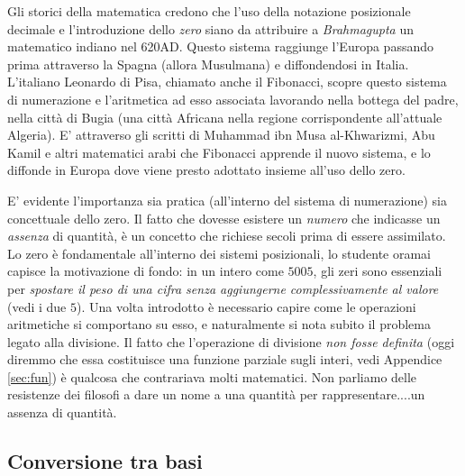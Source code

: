 {Gli storici della matematica credono che l'uso della notazione posizionale decimale e l'introduzione dello \emph{zero} siano da attribuire a \emph{Brahmagupta} un matematico indiano nel 620\textrm{AD}. Questo sistema raggiunge l'Europa passando prima attraverso la Spagna (allora Musulmana) e diffondendosi in Italia. L'italiano Leonardo di Pisa, chiamato anche il Fibonacci, scopre questo sistema di numerazione e l'aritmetica ad esso associata lavorando nella bottega del padre, nella città di Bugia (una città Africana nella regione corrispondente all'attuale Algeria).
E' attraverso gli scritti di Muhammad ibn Musa al-Khwarizmi, Abu Kamil e altri matematici arabi che Fibonacci apprende il nuovo sistema, e lo diffonde in Europa dove viene presto adottato insieme all'uso dello zero. 

E' evidente l'importanza sia pratica (all'interno
del sistema di numerazione) sia concettuale dello zero. Il fatto che dovesse
esistere un \emph{numero} che indicasse un \emph{assenza} di quantità, è un
concetto che richiese secoli prima di essere assimilato. Lo zero è fondamentale
all'interno dei sistemi posizionali, lo studente oramai capisce la motivazione
di fondo: in un intero come $5005$, gli zeri sono essenziali per \emph{spostare
il peso di una cifra senza aggiungerne complessivamente al valore} (vedi i due
$5$). Una volta introdotto è necessario capire come le operazioni aritmetiche
si comportano su esso, e naturalmente si nota subito il problema legato alla
divisione. Il fatto che l'operazione di divisione \emph{non fosse definita}
(oggi diremmo che essa costituisce una funzione parziale sugli interi, vedi Appendice \ref{sec:fun}) è
qualcosa che contrariava molti matematici. Non parliamo delle resistenze dei
filosofi a dare un nome a una quantità per rappresentare....un assenza di
quantità.
}

\subsection{Conversione tra basi}\label{sec:conversione}

